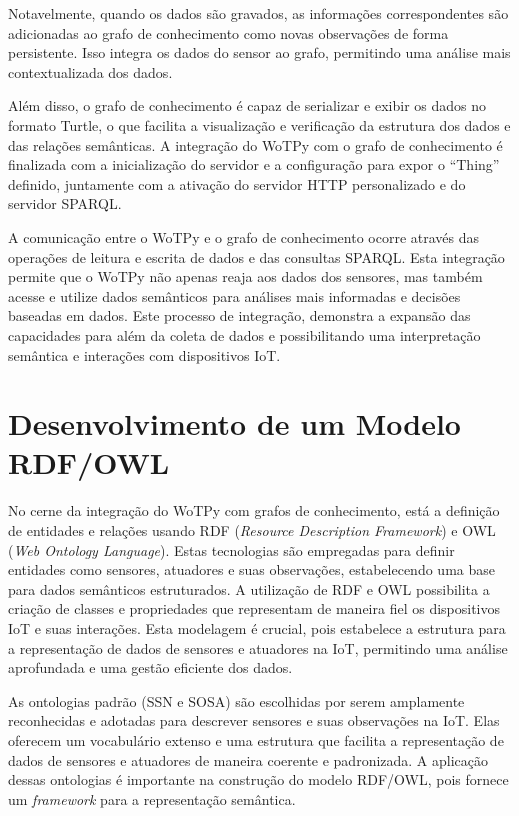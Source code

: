 Notavelmente, quando os dados são gravados, as informações correspondentes são adicionadas ao grafo de conhecimento como novas observações de forma persistente. Isso integra os dados do sensor ao grafo, permitindo uma análise mais contextualizada dos dados.

Além disso, o grafo de conhecimento é capaz de serializar e exibir os dados no formato Turtle, o que facilita a visualização e verificação da estrutura dos dados e das relações semânticas. A integração do WoTPy com o grafo de conhecimento é finalizada com a inicialização do servidor e a configuração para expor o ``Thing'' definido, juntamente com a ativação do servidor HTTP personalizado e do servidor SPARQL.

A comunicação entre o WoTPy e o grafo de conhecimento ocorre através das operações de leitura e escrita de dados e das consultas SPARQL. Esta integração permite que o WoTPy não apenas reaja aos dados dos sensores, mas também acesse e utilize dados semânticos para análises mais informadas e decisões baseadas em dados. Este processo de integração, demonstra a expansão das capacidades para além da coleta de dados e possibilitando uma interpretação semântica e interações com dispositivos IoT.

\section{Desenvolvimento de um Modelo RDF/OWL}

No cerne da integração do WoTPy com grafos de conhecimento, está a definição de entidades e relações usando RDF (\textit{Resource Description Framework}) e OWL (\textit{Web Ontology Language}). Estas tecnologias são empregadas para definir entidades como sensores, atuadores e suas observações, estabelecendo uma base para dados semânticos estruturados. A utilização de RDF e OWL possibilita a criação de classes e propriedades que representam de maneira fiel os dispositivos IoT e suas interações. Esta modelagem é crucial, pois estabelece a estrutura para a representação de dados de sensores e atuadores na IoT, permitindo uma análise aprofundada e uma gestão eficiente dos dados.

As ontologias padrão (SSN e SOSA) são escolhidas por serem amplamente reconhecidas e adotadas para descrever sensores e suas observações na IoT. Elas oferecem um vocabulário extenso e uma estrutura que facilita a representação de dados de sensores e atuadores de maneira coerente e padronizada. A aplicação dessas ontologias é importante na construção do modelo RDF/OWL, pois fornece um \textit{framework} para a representação semântica.

